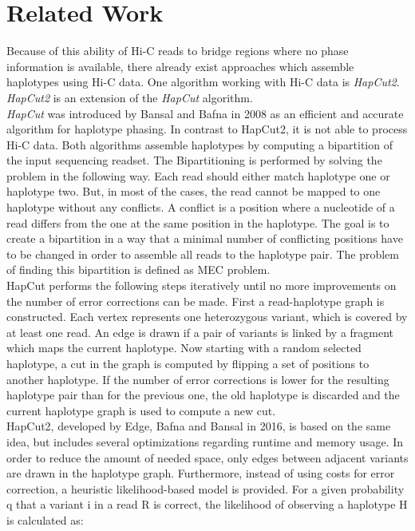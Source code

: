 \section{Related Work}
\label{section:RelWork}
Because of this ability of Hi-C reads to bridge regions where no phase information is available, there already exist approaches which assemble haplotypes using Hi-C data. One algorithm working with Hi-C data is \textit{HapCut2}. \textit{HapCut2} is an extension of the \textit{HapCut} algorithm. \cite{HapCut2}\\
\textit{HapCut} was introduced by Bansal and Bafna in 2008 as an efficient and accurate algorithm for haplotype phasing. In contrast to HapCut2, it is not able to process Hi-C data. Both algorithms assemble haplotypes by computing a bipartition of the input sequencing readset. The Bipartitioning is performed by solving the  problem in the following way. Each read should either match haplotype one or haplotype two. But, in most of the cases, the read cannot be mapped to one haplotype without any conflicts. A conflict is a position where a nucleotide of a read differs from the one at the same position in the haplotype. The goal is to create a bipartition in a way that a minimal number of conflicting positions have to be changed in order to assemble all reads to the haplotype pair. The problem of finding this bipartition is defined as \ac{MEC} problem. \cite{HapCut2}\\
HapCut performs the following steps iteratively until no more improvements on the number of error corrections can be made. First a read-haplotype graph is constructed. Each vertex represents one heterozygous variant, which is covered by at least one read. An edge is drawn if a pair of variants is linked by a fragment which maps the current haplotype. Now starting with a random selected haplotype, a cut in the graph is computed by flipping a set of positions to another haplotype. If the number of error corrections is lower for the resulting haplotype pair than for the previous one, the old haplotype is discarded and the current haplotype graph is used to compute a new cut. \cite{HapCut}\\
HapCut2, developed by Edge, Bafna and Bansal in 2016, is based on the same idea, but includes several optimizations regarding runtime and memory usage. In order to reduce the amount of needed space, only edges between adjacent variants are drawn in the haplotype graph. Furthermore, instead of using costs for error correction, a heuristic likelihood-based model is provided. For a given probability q that a variant i in a read R is correct, the likelihood of observing a haplotype H is calculated as:
